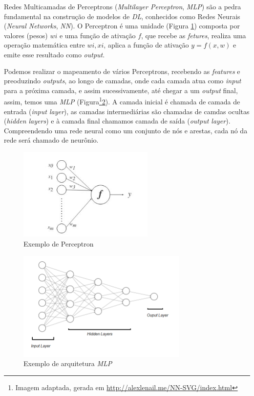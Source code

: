 Redes Multicamadas de Perceptrons (\textit{Multilayer Perceptron}, \textit{MLP}) são a pedra fundamental na construção de modelos de \textit{DL}, conhecidos como Redes Neurais (\textit{Neural Networks}, \textit{NN}). O Perceptron é uma unidade (Figura \ref{fig:perceptron}) composta por valores (pesos) $wi$ e uma função de ativação $f$,  que recebe as \textit{fetures}, realiza uma operação matemática entre $wi,xi$, aplica a função de ativação $y = f(x,w)$ e emite esse resultado como \textit{output}.

Podemos realizar o mapeamento de vários Perceptrons, recebendo as \textit{features} e preoduzindo \textit{outputs}, ao longo de camadas, onde cada camada atua como \textit{input} para a próxima camada, e assim sucessivamente, até chegar a um \textit{output} final, assim, temos uma \textit{MLP} (Figura\footnote{Imagem adaptada, gerada em \url{http://alexlenail.me/NN-SVG/index.html}}\ref{fig:mlp}). A camada inicial é chamada de camada de entrada (\textit{input layer}), as camadas intermediárias são chamadas de camdas ocultas (\textit{hidden layers}) e à camada final chamamos camada de saída (\textit{output layer}). Compreendendo uma rede neural como um conjunto de nós e arestas, cada nó da rede será chamado de neurônio.

\begin{figure}[!ht]
\centering
\includegraphics[width=0.6\textwidth]{imagens/perceptron.png}
\caption{\label{fig:perceptron}Exemplo de Perceptron}

\author{Fonte: Retirado de \cite{12}}
\end{figure}

\begin{figure}[!h]
\centering
\includegraphics[width=0.75\textwidth]{imagens/mlp02.png}
\caption{\label{fig:mlp}Exemplo de arquitetura \textit{MLP}}

\end{figure}

